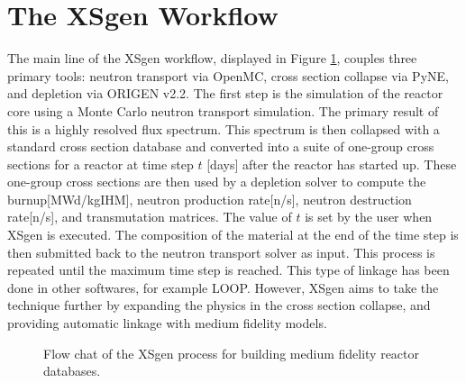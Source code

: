 \documentclass{article}
\begin{document}
\section{The XSgen Workflow}
\label{sec-workflow}

The main line of the XSgen workflow, displayed in Figure \ref{fig:flow}, couples three primary tools: neutron transport via OpenMC,
cross section collapse via PyNE, and depletion via ORIGEN v2.2. The first step is the simulation
of the reactor core using a Monte Carlo neutron transport simulation. The primary result of
this is a highly resolved flux spectrum. This spectrum is then collapsed with a standard
cross section database and converted into a suite of one-group cross sections for a reactor
at time step $t$ [days] after the reactor has started up. These one-group cross sections are
then used by a depletion solver to compute the burnup[MWd/kgIHM], neutron production rate[n/s], neutron
destruction rate[n/s], and transmutation matrices. The value of $t$ is set by the user when XSgen
is executed. The composition of the material at the end of the time step is then submitted
back to the neutron transport solver as input. This process is repeated until the maximum time
step is reached. This type of linkage has been done in other softwares, for example LOOP\cite{loop}. However, 
XSgen aims to take the technique further by expanding the physics in the cross section collapse, and providing 
automatic linkage with medium fidelity models.  

\begin{figure}\center{}
\caption{Flow chat of the XSgen process for building medium fidelity reactor databases.}
\label{fig:flow}
\end{figure}
\end{document}
